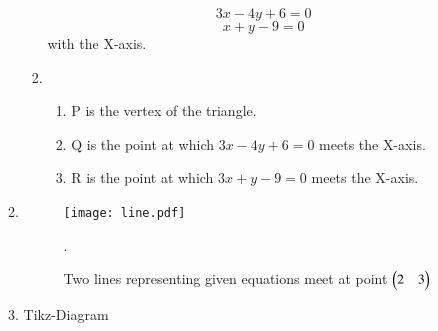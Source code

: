 \documentclass[journal,12pt,twocolumn]{IEEEtran}
\renewcommand\thesection{\arabic{section}}
\begin{document}
\begin{enumerate}[label=\thesection.\arabic*.,ref=\thesection.\theenumi]
\begin{enumerate}
\begin{enumerate}
    \[ 3x-4y+6=0 \]
    \[ x+y-9=0 \]
    with the X-axis.
    \item 
    \begin{enumerate}
        \item P is the vertex of the triangle.
        \item Q is the point at which \(3x-4y+6=0\) meets the X-axis.
        \item R is the point at which \(3x+y-9=0\) meets the X-axis.
    \end{enumerate}
\end{enumerate}

\item 
\begin{figure}[h]
\texttt{[image: line.pdf]}
\caption{Two lines representing given equations meet at point $\begin{pmatrix}2 & 3\end{pmatrix}$ }.
\end{figure}
\item {}
\begin{center}
    Tikz-Diagram
\end{center}
\end{enumerate}
\end{enumerate}
\end{document}
